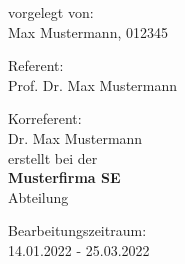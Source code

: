 \begin{titlepage}
\begin{center}
      vorgelegt von:\\
      Max Mustermann, 012345\\
  
      \vspace{0.75cm}
  
      Referent:\\
      Prof. Dr. Max Mustermann\\
  
      \vspace{0.25cm}
  
      Korreferent:\\
      Dr. Max Mustermann\\
  
      \vspace{0.75cm}
      erstellt bei der\\
      \textbf{Musterfirma SE}\\
      Abteilung
  
      \vfill
  
      
      Bearbeitungszeitraum:\\
      14.01.2022 - 25.03.2022
        
    \end{center}
\end{titlepage}
\restoregeometry
